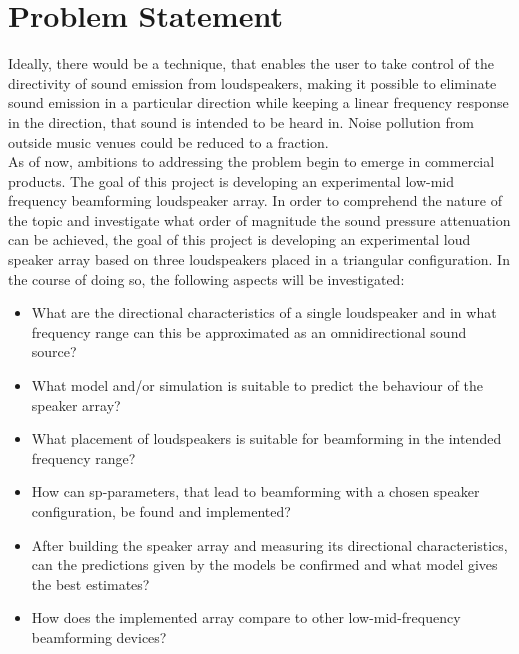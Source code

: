 \section{Problem Statement}\label{sec:problem_statement}
Ideally, there would be a technique, that enables the user to take control of the directivity of sound emission from loudspeakers, making it possible to eliminate sound emission in a particular direction while keeping a linear frequency response in the direction, that sound is intended to be heard in. Noise pollution from outside music venues could be reduced to a fraction.\\
As of now, ambitions to addressing the problem begin to emerge in commercial products.
The goal of this project is developing an experimental low-mid frequency beamforming loudspeaker array. In order to comprehend the nature of the topic and investigate what order of magnitude the sound pressure attenuation can be achieved, the goal of this project is developing an experimental loud speaker array based on three loudspeakers placed in a triangular configuration.
In the course of doing so, the following aspects will be investigated:
\begin{itemize}
\item What are the directional characteristics of a single loudspeaker and in what frequency range can this be approximated as an omnidirectional sound source?
\item What model and/or simulation is suitable to predict the behaviour of the speaker array?
\item What placement of loudspeakers is suitable for beamforming in the intended frequency range?
\item How can \gls{sp}-parameters, that lead to beamforming with a chosen speaker configuration, be found and implemented?
\item After building the speaker array and measuring its directional characteristics, can the predictions given by the models be confirmed and what model gives the best estimates?
\item How does the implemented array compare to other low-mid-frequency beamforming devices?
\end{itemize}

%



